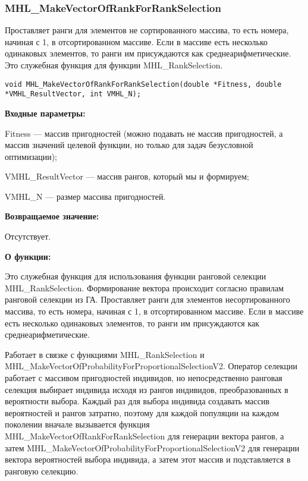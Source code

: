 \documentclass[a4paper,12pt]{article}
\begin{document}
\subsubsection{MHL\_MakeVectorOfRankForRankSelection}\label{MHL_MakeVectorOfRankForRankSelection}

Проставляет ранги для элементов не сортированного массива, то есть номера, начиная с 1, в отсортированном массиве.  Если в массиве есть несколько одинаковых элементов, то ранги им присуждаются как среднеарифметические. Это служебная функция для функции MHL\_RankSelection.


\begin{lstlisting}[label=code_syntax_MHL_MakeVectorOfRankForRankSelection,caption=Синтаксис]
void MHL_MakeVectorOfRankForRankSelection(double *Fitness, double *VMHL_ResultVector, int VMHL_N);
\end{lstlisting}

\textbf{Входные параметры:}

Fitness --- массив пригодностей (можно подавать не массив пригодностей, а массив значений целевой функции, но только для задач безусловной оптимизации);
 
VMHL\_ResultVector --- массив рангов, который мы и формируем;
 
VMHL\_N --- размер массива пригодностей.

\textbf{Возвращаемое значение:} 
 
Отсутствует.
 
\textbf{О функции:}

Это служебная функция для использования функции ранговой селекции MHL\_RankSelection. Формирование вектора происходит согласно правилам ранговой селекции из ГА. Проставляет ранги для элементов несортированного массива, то есть номера, начиная с 1, в отсортированном массиве. Если в массиве есть несколько одинаковых элементов, то ранги им присуждаются как среднеарифметические.

Работает в связке с функциями MHL\_RankSelection и MHL\_MakeVectorOfProbabilityForProportionalSelectionV2. Оператор селекции работает с массивом пригодностей индивидов, но непосредственно ранговая селекция выбирает индивида исходя из рангов индивидов, преобразованных в вероятности выбора. Каждый раз для выбора индивида создавать массив вероятностей и рангов затратно, поэтому для каждой популяции на каждом поколении вначале вызывается функция MHL\_MakeVectorOfRankForRankSelection для генерации вектора рангов, а затем MHL\_MakeVectorOfProbabilityForProportionalSelectionV2 для генерации вектора вероятностей выбора индивида, а затем этот массив и подставляется в ранговую селекцию.
\end{document}
